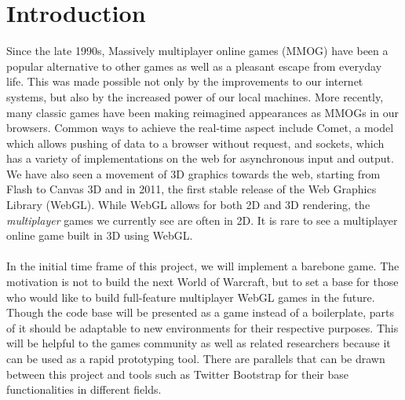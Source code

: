 \documentclass{acmsiggraph}
\begin{document}

\hrulefill
\section{Introduction}

Since the late 1990s, Massively multiplayer online games (MMOG) have been a popular alternative to other games as well as a pleasant escape from everyday life. This was made possible not only by the improvements to our internet systems, but also by the increased power of our local machines. More recently, many classic games have been making reimagined appearances as MMOGs in our browsers. Common ways to achieve the real-time aspect include Comet, a model which allows pushing of data to a browser without request, and sockets, which has a variety of implementations on the web for asynchronous input and output. We have also seen a movement of 3D graphics towards the web, starting from Flash to Canvas 3D and in 2011, the first stable release of the Web Graphics Library (WebGL). While WebGL allows for both 2D and 3D rendering, the \emph{multiplayer} games we currently see are often in 2D. It is rare to see a multiplayer online game built in 3D using WebGL.
\\\\
In the initial time frame of this project, we will implement a barebone game. The motivation is not to build the next World of Warcraft, but to set a base for those who would like to build full-feature multiplayer WebGL games in the future. Though the code base will be presented as a game instead of a boilerplate, parts of it should be adaptable to new environments for their respective purposes. This will be helpful to the games community as well as related researchers because it can be used as a rapid prototyping tool. There are parallels that can be drawn between this project and tools such as Twitter Bootstrap for their base functionalities in different fields.
\end{document}
